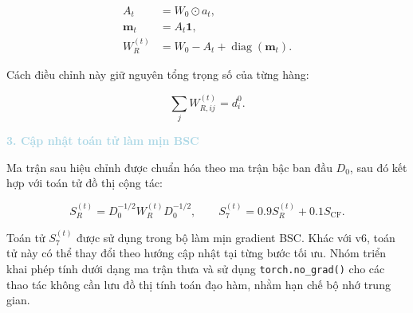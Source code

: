 \begin{equation}
\begin{aligned}
A_t &= W_0\odot a_t,\\
\mathbf{m}_t &= A_t\mathbf{1},\\
W_R^{(t)} &= W_0-A_t+\operatorname{diag}(\mathbf{m}_t).
\end{aligned}
\end{equation}

Cách điều chỉnh này giữ nguyên tổng trọng số của từng hàng:

\begin{equation}
\sum_j W_{R,ij}^{(t)}=d_i^0.
\end{equation}

\noindent\textcolor{lightblue}{\textbf{3. Cập nhật toán tử làm mịn BSC}}

Ma trận sau hiệu chỉnh được chuẩn hóa theo ma trận bậc ban đầu $D_0$, sau đó kết hợp với toán tử đồ thị cộng tác:

\begin{equation}
S_R^{(t)}
=
D_0^{-1/2}W_R^{(t)}D_0^{-1/2},
\qquad
S_7^{(t)}
=
0.9S_R^{(t)}+0.1S_{\mathrm{CF}}.
\end{equation}

Toán tử $S_7^{(t)}$ được sử dụng trong bộ làm mịn gradient BSC. Khác với v6, toán tử này có thể thay đổi theo hướng cập nhật tại từng bước tối ưu. Nhóm triển khai phép tính dưới dạng ma trận thưa và sử dụng \texttt{torch.no\_grad()} cho các thao tác không cần lưu đồ thị tính toán đạo hàm, nhằm hạn chế bộ nhớ trung gian.


